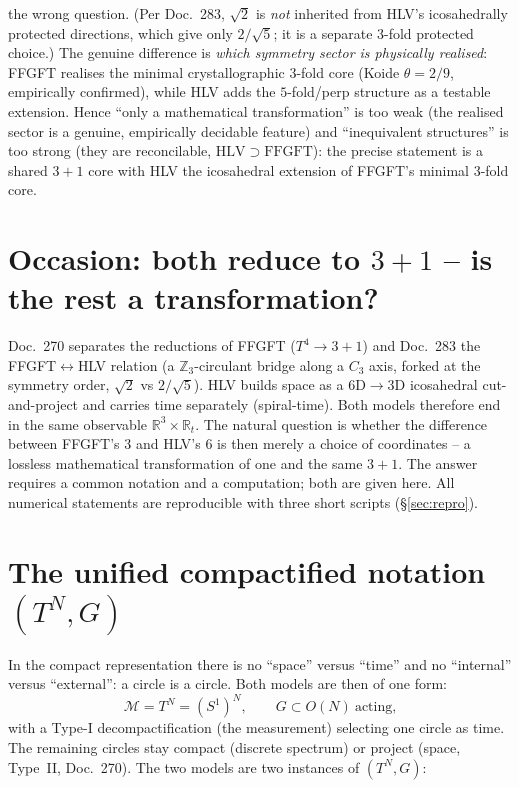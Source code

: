 the wrong question. (Per Doc.~283, $\sqrt2$ is \emph{not} inherited from HLV's
icosahedrally protected directions, which give only $2/\sqrt5$; it is a separate $3$-fold
protected choice.) The genuine difference is \emph{which symmetry sector is physically
realised}: FFGFT realises the minimal crystallographic $3$-fold core (Koide $\theta=2/9$,
empirically confirmed), while HLV adds the $5$-fold/perp structure as a testable extension.
Hence ``only a mathematical transformation'' is too weak (the realised sector is a genuine,
empirically decidable feature) and ``inequivalent structures'' is too strong (they are
reconcilable, $\mathrm{HLV}\supset\mathrm{FFGFT}$): the precise statement is a shared
$3{+}1$ core with HLV the icosahedral extension of FFGFT's minimal $3$-fold core.

\section{Occasion: both reduce to $3{+}1$ -- is the rest a transformation?}
Doc.~270 separates the reductions of FFGFT ($T^4\to 3{+}1$) and Doc.~283 the
FFGFT$\leftrightarrow$HLV relation (a $\mathbb{Z}_3$-circulant bridge along a $C_3$ axis,
forked at the symmetry order, $\sqrt2$ vs $2/\sqrt5$). HLV builds space as a $6$D$\to3$D
icosahedral cut-and-project and carries time separately (spiral-time). Both models
therefore end in the same observable $\mathbb{R}^3\times\mathbb{R}_t$. The natural
question is whether the difference between FFGFT's $3$ and HLV's $6$ is then merely a
choice of coordinates -- a lossless mathematical transformation of one and the same
$3{+}1$. The answer requires a common notation and a computation; both are given here. All
numerical statements are reproducible with three short scripts (\S\ref{sec:repro}).

\section{The unified compactified notation $(T^N, G)$}
In the compact representation there is no ``space'' versus ``time'' and no
``internal'' versus ``external'': a circle is a circle. Both models are then of one form:
\begin{equation}
\mathcal{M}=T^N=(S^1)^N,\qquad G\subset O(N)\ \text{acting,}
\end{equation}
with a Type-I decompactification (the measurement) selecting one circle as time. The
remaining circles stay compact (discrete spectrum) or project (space, Type~II,
Doc.~270). The two models are two instances of $(T^N,G)$:

